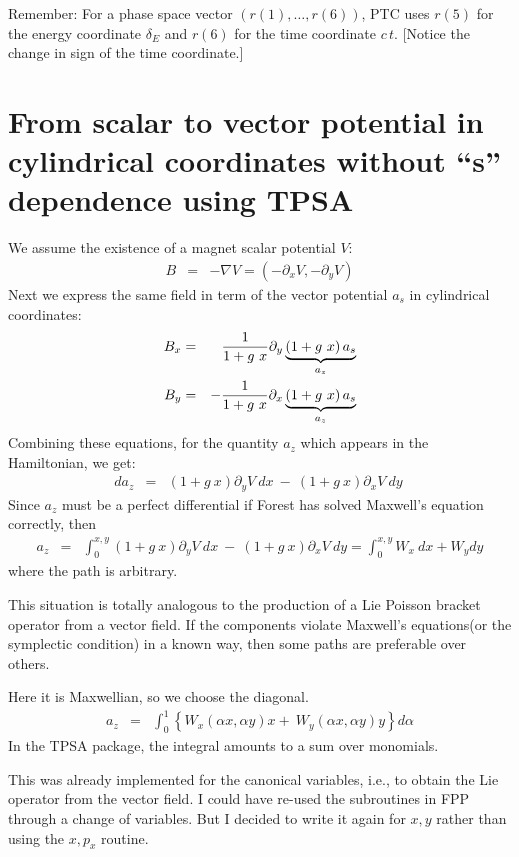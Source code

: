 \documentclass[11pt,openany]{article}
\begin{document}
Remember: For a phase space vector $(r(1), \ldots, r(6))$, PTC uses $r(5)$ for the energy
coordinate $\delta_E$ and $r(6)$ for the time coordinate $c \, t$. [Notice the change in
sign of the time coordinate.]




\section{From scalar to vector potential in cylindrical coordinates without ``s'' dependence using TPSA}

We assume the existence of a magnet scalar potential $V$:
\begin{eqnarray}
  B&=&-\nabla V=\left({-{\partial }_{x}V,-{\partial }_{y}V}\right)
\end{eqnarray}
Next we express the same field in term of the vector potential $a_s$ in cylindrical coordinates:
\begin{eqnarray}
  {B}_{x} &=
  & {1 \over 1+g\ x}{\partial }_{y}\underbrace{\left({1+g\ x}\right){a}_{s}}\limits_{{a}_{z}}^{} \\ {B}_{y} &=
  & -{1 \over 1+g\ x}{\partial }_{x}\underbrace{\left({1+g\ x}\right){a}_{s}}\limits_{{a}_{z}}^{}
\end{eqnarray}
Combining these equations, for the quantity $a_z$ which appears in the Hamiltonian, we get:
\begin{eqnarray}
  d{a}_{z} &=
  & \left({1+g\ x}\right){\partial }_{y}V\ dx\ -\ \left({1+g\ x}\right){\partial }_{x}V\ dy\ 
\end{eqnarray}
Since $a_z$ must be a perfect differential if Forest has solved Maxwell's equation correctly, then
\begin{eqnarray}
  {a}_{z} &=
  & \int_{0}^{x,y}\left({1+g\ x}\right){\partial }_{y}V\ dx\ -\ \left({1+g\ x}\right){\partial }_{x}V\ dy=
  \int_{0}^{x,y}{W}_{x}\ dx+{W}_{y}dy
\end{eqnarray}
where the path is arbitrary.

This situation is totally analogous to the production of a Lie Poisson bracket operator
from a vector field. If the components violate Maxwell's equations(or the symplectic
condition) in a known way, then some paths are preferable over others.

Here it is Maxwellian, so we choose the diagonal.
\begin{eqnarray}
  {a}_{z} &=
  & \int_{0}^{1}\left\{{{W}_{x}(\alpha x,\alpha y)x+\ {W}_{y}(\alpha x,\alpha y)y}\right\}d\alpha 
\end{eqnarray}
In the TPSA package, the integral amounts to a sum over monomials.
 
This was already implemented for the canonical variables, i.e., to obtain the Lie operator
from the vector field. I could have re-used the subroutines in FPP through a change of
variables. But I decided to write it again for $x,y$ rather than using the $x,p_x$
routine.
\end{document}

